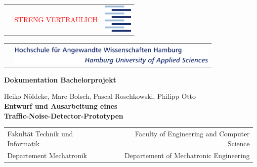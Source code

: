 \newpage
\thispagestyle{empty}
\AddToShipoutPicture*{\BackgroundPic}


\begin{center}

\begin{tabular}{p{3cm}p{8cm}p{4cm}}
&\textcolor{red}{\LARGE{STRENG VERTRAULICH}} & \vspace{-0.5cm} \includegraphics[height=1.4cm]{Logo_Titelseite_ohne_text.png}\\
\end{tabular}

\begin{tabular}{p{5cm}p{10.5cm}}
&\\
&\includegraphics[height=0.9cm]{Logo_Titelseite_ohne_Symbol.png}\\
\end{tabular}

\end{center}

\vspace{7cm}

\begin{flushright}
\begin{Huge}
\textbf{Dokumentation Bachelorprojekt} \\
\end{Huge}
\vspace{2cm}
\Large{Heiko Nöldeke, Marc Bolsch, Pascal Roschkowski, Philipp Otto} \\
\vspace{0.5cm}
\LARGE{\textbf{Entwurf und Ausarbeitung eines \\ Traffic-Noise-Detector-Prototypen}}
\end{flushright}
\vspace{8cm}

\begin{center}
\begin{tabular}{lp{2cm}r}
Fakultät Technik und Informatik && Faculty of Engineering and Computer Science \\
Departement Mechatronik && Departement of Mechatronic Engineering \\
\end{tabular}
\end{center}

\newpage
\restoregeometry

\ClearShipoutPicture